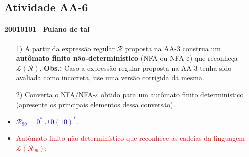 \documentclass[12pt]{article}
\def\discente{Fulano de tal}
\def\matricula{20010101}
\def\aa{6}
\def\myling{{99}} %
\begin{document}
\pagestyle{empty}
\subsection*{Atividade AA-\aa}
 \paragraph{\matricula -- \discente}
%
 \begin{itemize}
  \item [1)] A partir da expressão regular $\mathcal{R}$ proposta na AA-3 construa um \textbf{autômato finito não-determinístico} (NFA ou NFA-$\varepsilon$) que reconheça $\mathcal{L}(\mathcal{R})$. \textbf{Obs.:} Caso a expressão regular proposta na AA-3 tenha sido avaliada como incorreta, use uma versão corrigida da mesma.
  \item [2)] Converta o NFA/NFA-$\varepsilon$ obtido para um autômato finito determinístico (apresente os principais elementos dessa conversão).
  \item \textcolor{blue}{$\mathcal{R}_{\myling} = 0^*\cup 0(10)^*$.}
  \item  \textcolor{red}{Autômato finito não determinístico que reconhece as cadeias da linguagem $\mathcal{L}(\mathcal{R}_{\myling})$:}\\
\end{itemize}
\end{document}
